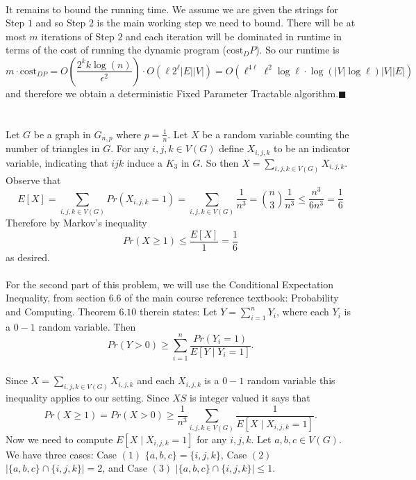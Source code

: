 \documentclass[letterpaper,12pt,oneside,onecolumn]{article}
\begin{document}
\paragraph{}
It remains to bound the running time. We assume we are given the strings for Step $1$ and so Step $2$ is the main working step we need to bound. There will be at most $m$ iterations of Step $2$ and each iteration will be dominated in runtime in terms of the cost of running the dynamic program ($\text{cost}_DP$). So our runtime is
$$m\cdot\text{cost}_{DP} = O(\frac{2^kk\log(n)}{\epsilon^2})\cdot O(\ell2^\ell|E||V|) = O(\ell^{4\ell} \ell^2\log\ell\cdot\log(|V|\log\ell)|V||E
|)$$
and therefore we obtain a deterministic Fixed Parameter Tractable algorithm.$\blacksquare$
\newpage
\section{}
\paragraph{}
Let $G$ be a graph in $G_{n,p}$ where $p = \frac{1}{n}$. Let $X$ be a random variable counting the number of triangles in $G$. For any $i,j,k \in V(G)$ define $X_{i,j,k}$ to be an indicator variable, indicating that $ijk$ induce a $K_3$ in $G$. So then $X = \sum_{i,j,k \in V(G)} X_{i,j,k}$. Observe that
$$ E[X] = \sum_{i,j,k \in V(G)} Pr(X_{i,j,k}=1) = \sum_{i,j,k \in V(G)} \frac{1}{n^3} = {n\choose 3}\frac{1}{n^3} \leq \frac{n^3}{6n^3}= \frac{1}{6}$$
Therefore by Markov's inequality
$$Pr(X \geq 1) \leq \frac{E[X]}{1} = \frac{1}{6}$$
as desired.
\paragraph{}
For the second part of this problem, we will use the Conditional Expectation Inequality, from section $6.6$ of the main course reference textbook: Probability and Computing. Theorem $6.10$ therein states: Let $Y = \sum_{i=1}^n Y_i$, where each $Y_i$ is a $0-1$ random variable. Then
$$Pr(Y>0) \geq \sum_{i=1}^n \frac{Pr(Y_i = 1)}{E[Y \mid Y_i = 1]}.$$
\paragraph{}
Since $X = \sum_{i,j,k \in V(G)} X_{i,j,k}$ and each $X_{i,j,k}$ is a $0-1$ random variable this inequality applies to our setting. Since $XS$ is integer valued it says that
$$Pr(X \geq 1) = Pr(X > 0) \geq \frac{1}{n^3}\sum_{i,j,k \in V(G)}\frac{1}{E[X\mid X_{i,j,k}=1]}.$$
Now we need to compute $E[X\mid X_{i,j,k}=1]$ for any $i,j,k$. Let $a,b,c \in V(G)$. We have three cases: Case $(1)$ $\{a,b,c\} = \{i,j,k\}$, Case $(2)$  $|\{a,b,c\} \cap \{i,j,k\}| = 2$, and Case $(3)$ $|\{a,b,c\} \cap \{i,j,k\}| \leq 1$.
\end{document}
